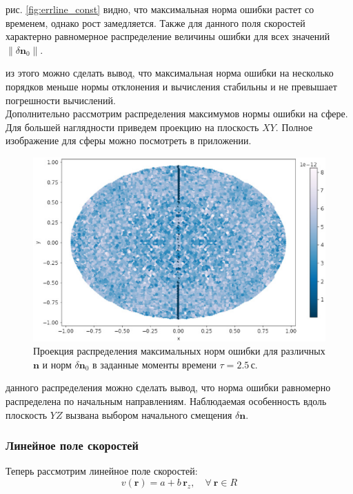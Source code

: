\documentclass[12pt, cleqn, a4paper]{article}
\newcommand{\bfv}[1]{\mathbf{#1}}
\newcommand{\dn}{\delta \bfv{n}}
\begin{document}
 рис. \ref{fig:errline_const} видно, что максимальная норма ошибки растет со временем, однако рост замедляется. Также для данного поля скоростей характерно равномерное распределение величины ошибки для всех значений $\|\dn_0\|$. 

 из этого можно сделать вывод, что максимальная норма ошибки на несколько порядков меньше нормы отклонения и вычисления стабильны и не превышает погрешности вычислений.\\

Дополнительно рассмотрим распределения максимумов нормы ошибки на сфере. Для большей наглядности приведем проекцию на плоскость $XY$. Полное изображение для сферы можно посмотреть в приложении.
\begin{figure}[H] 
\centering
\includegraphics[width=1.0\linewidth]{proj_grad_const.eps}
\caption{Проекция распределения максимальных норм ошибки для различных $\bfv{n}$ и норм $\dn_0$ в заданные моменты времени $\tau = 2.5$\,с.}
\label{fig:proj_grad_const}
\end{figure}

 данного распределения можно сделать вывод, что норма ошибки равномерно распределена по начальным направлениям. Наблюдаемая особенность вдоль плоскость $YZ$ вызвана выбором начального смещения $\dn$.\\


\subsubsection{Линейное поле скоростей}
Теперь рассмотрим линейное поле скоростей:
\begin{equation*}
    v(\bfv{r}) = a + b\,\bfv{r}_z, \quad \forall \ \bfv{r} \in R
\end{equation*}
\end{document}
